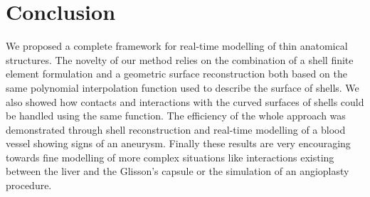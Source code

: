 \documentclass{llncs}
\begin{document}
\section{Conclusion}
We proposed a complete framework for real-time modelling of thin anatomical structures. The novelty of our method relies on the combination of a shell finite element formulation and a geometric surface reconstruction both based on the same polynomial interpolation function used to describe the surface of shells. We also showed how contacts and interactions with the curved surfaces of shells could be handled using the same function. The efficiency of the whole approach was demonstrated through shell reconstruction and real-time modelling of a blood vessel showing signs of an aneurysm. Finally these results are very encouraging towards fine modelling of more complex situations like interactions existing between the liver and the Glisson's capsule or the simulation of an angioplasty procedure. 




\end{document}
